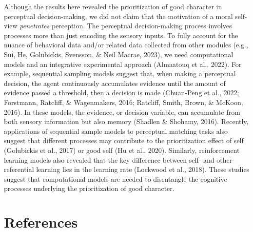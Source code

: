 \documentclass[
  man]{apa6}
\begin{document}
Although the results here revealed the prioritization of good character in perceptual decision-making, we did not claim that the motivation of a moral self-view \emph{penetrates} perception. The perceptual decision-making process involves processes more than just encoding the sensory inputs. To fully account for the nuance of behavioral data and/or related data collected from other modules (e.g., Sui, He, Golubickis, Svensson, \& Neil Macrae, 2023), we need computational models and an integrative experimental approach (Almaatouq et al., 2022). For example, sequential sampling models suggest that, when making a perceptual decision, the agent continuously accumulates evidence until the amount of evidence passed a threshold, then a decision is made (Chuan-Peng et al., 2022; Forstmann, Ratcliff, \& Wagenmakers, 2016; Ratcliff, Smith, Brown, \& McKoon, 2016). In these models, the evidence, or decision variable, can accumulate from both sensory information but also memory (Shadlen \& Shohamy, 2016). Recently, applications of sequential sample models to perceptual matching tasks also suggest that different processes may contribute to the prioritization effect of self (Golubickis et al., 2017) or good self (Hu et al., 2020). Similarly, reinforcement learning models also revealed that the key difference between self- and other-referential learning lies in the learning rate (Lockwood et al., 2018). These studies suggest that computational models are needed to disentangle the cognitive processes underlying the prioritization of good character.

\hypertarget{references}{%
\section{References}\label{references}}

\begingroup
\setlength{\parindent}{-0.5in}
\setlength{\leftskip}{0.5in}
\end{document}
